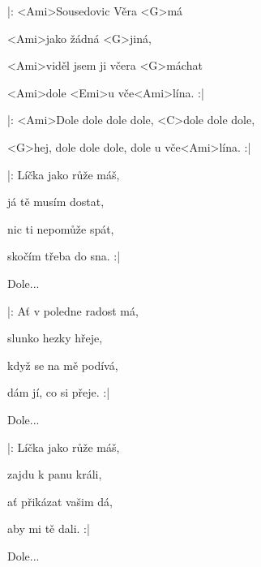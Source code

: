 

\zs
|: <Ami>Sousedovic Věra <G>má

<Ami>jako žádná <G>jiná,

<Ami>viděl jsem ji včera <G>máchat

<Ami>dole <Emi>u vče<Ami>lína. :|
\ks

\zr
|: <Ami>Dole dole dole dole, <C>dole dole dole,

<G>hej, dole dole dole, dole u vče<Ami>lína. :|
\kr

\zs
|: Líčka jako růže máš,

já tě musím dostat,

nic ti nepomůže spát,

skočím třeba do sna. :|
\ks

\zr
Dole... \kr

\zs
|: Ať v poledne radost má,

slunko hezky hřeje,

když se na mě podívá,

dám jí, co si přeje. :|
\ks

\zr
Dole... \kr

\zs
|: Líčka jako růže máš,

zajdu k panu králi,

ať přikázat vašim dá,

aby mi tě dali. :|
\ks

\zr
Dole... \kr

\kp

